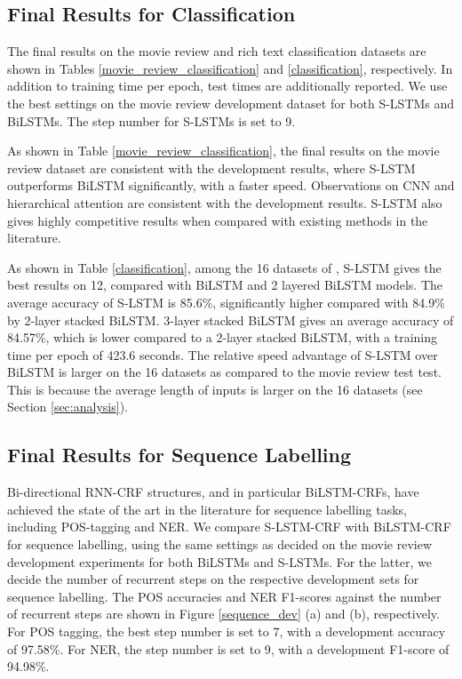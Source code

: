 \documentclass[11pt,a4paper]{article}
\begin{document}
\subsection{Final Results for Classification}


The final results on the movie review and rich text classification datasets are shown in Tables \ref{movie_review_classification} and \ref{classification}, respectively. 
In addition to training time per epoch, test times are additionally reported.
We use the best settings on the movie review development dataset for both S-LSTMs and BiLSTMs. 
The step number for S-LSTMs is set to 9. 


As shown in Table \ref{movie_review_classification}, the final results on the movie review dataset are consistent with the development results, where S-LSTM outperforms BiLSTM significantly, with a faster speed. 
Observations on CNN and hierarchical attention are consistent with the development results. 
S-LSTM also gives highly competitive results when compared with existing methods in the literature.


As shown in Table \ref{classification}, among the 16 datasets of , S-LSTM gives the best results on 12, compared with BiLSTM and 2 layered BiLSTM models. 
The average accuracy of S-LSTM is 85.6\%, significantly higher compared with 84.9\% by 2-layer stacked BiLSTM. 
3-layer stacked BiLSTM gives an average accuracy of 84.57\%, which is lower compared to a 2-layer stacked BiLSTM, with a training time per epoch of 423.6 seconds. 
The relative speed advantage of S-LSTM over BiLSTM is larger on the 16 datasets as compared to the movie review test test. 
This is because the average length of inputs is larger on the 16 datasets (see Section \ref{sec:analysis}).


\subsection{Final Results for Sequence Labelling}


Bi-directional RNN-CRF structures, and in particular BiLSTM-CRFs, have achieved the state of the art in the literature for sequence labelling tasks, including POS-tagging and NER. 
We compare S-LSTM-CRF with BiLSTM-CRF for sequence labelling, using the same settings as decided on the movie review development experiments for both BiLSTMs and S-LSTMs. 
For the latter, we decide the number of recurrent steps on the respective development sets for sequence labelling. 
The POS accuracies and NER F1-scores against the number of recurrent steps are shown in Figure \ref{sequence_dev} (a) and (b), respectively. 
For POS tagging, the best step number is set to 7, with a development accuracy of 97.58\%. 
For NER, the step number is set to 9, with a development F1-score of 94.98\%. 
\end{document}
